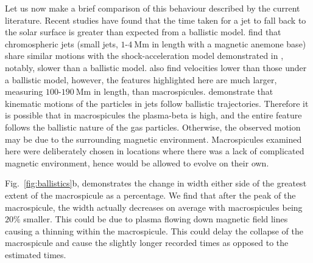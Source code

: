 Let us now make a brief comparison of this behaviour described by the current literature. Recent studies have found that the time taken for a jet to fall back to the solar surface is greater than expected from a ballistic model. \cite{Nishizuka2011} find that chromospheric jets (small jets, $1$-$4\ \textrm{Mm}$ in length with a magnetic anemone base) share similar motions with the shock-acceleration model demonstrated in \cite{ShibataSuematsu1982}, notably, slower than a ballistic model. \cite{Moschou2013} also find velocities lower than those under a ballistic model, however, the features highlighted here are much larger, measuring $100$-$190\ \textrm{Mm}$ in length, than macrospicules. \cite{Feng2012} demonstrate that kinematic motions of the particles in jets follow ballistic trajectories. Therefore it is possible that in macrospicules the plasma-beta is high, and the entire feature follows the ballistic nature of the gas particles. Otherwise, the observed motion may be due to the surrounding magnetic environment. Macrospicules examined here were deliberately chosen in locations where there was a lack of complicated magnetic environment, hence would be allowed to evolve on their own.



Fig.~\ref{fig:ballistics}b, demonstrates the change in width either side of the greatest extent of the macrospicule as a percentage. We find that after the peak of the macrospicule, the width actually decreases on average with macrospicules being $20\%$ smaller. This could be due to plasma flowing down magnetic field lines causing a thinning within the macrospicule. This could delay the collapse of the macrospicule and cause the slightly longer recorded times as opposed to the estimated times.       

